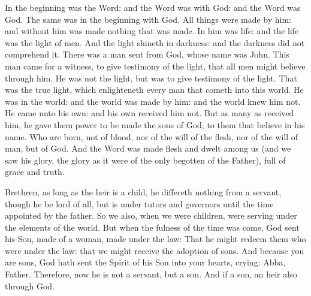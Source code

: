 In the beginning was the Word: and the Word was with God: and the Word was God.
The same was in the beginning with God.  All things were made by him: and
without him was made nothing that was made.  In him was life: and the life was
the light of men.  And the light shineth in darkness: and the darkness did not
comprehend it.  There was a man sent from God, whose name was John.  This man
came for a witness, to give testimony of the light, that all men might believe
through him.  He was not the light, but was to give testimony of the light.
That was the true light, which enlighteneth every man that cometh into this
world.  He was in the world: and the world was made by him: and the world knew
him not.  He came unto his own: and his own received him not.  But as many as
received him, he gave them power to be made the sons of God, to them that
believe in his name.  Who are born, not of blood, nor of the will of the flesh,
nor of the will of man, but of God.  And the Word was made flesh and dwelt
among us (and we saw his glory, the glory as it were of the only begotten of
the Father), full of grace and truth.






Brethren, as long as the heir is a child, he differeth nothing from a servant, though he
be lord of all, but is under tutors and governors until the time appointed by
the father.  So we also, when we were children, were serving under the elements
of the world.   But when the fulness of the time was come, God sent his Son, made
of a woman, made under the law: That he might redeem them who were under the
law: that we might receive the adoption of sons.  And because you are sons, God
hath sent the Spirit of his Son into your hearts, crying: Abba, Father.
Therefore, now he is not a servant, but a son. And if a son, an heir also
through God.



